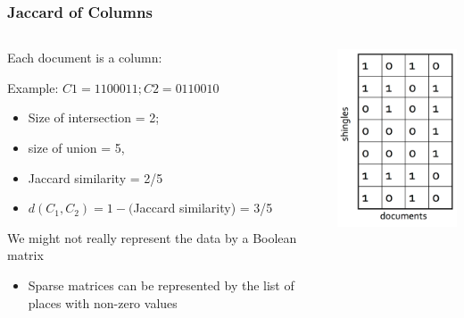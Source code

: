 \documentclass[svgnames]{beamer}
\begin{document}
\begin{frame} \frametitle{Jaccard of Columns}

 \begin{columns}[T]
  \begin{column}{0.5\textwidth}
  Each document is a column:

  {\scriptsize
  \begin{block}{Example: $C1 = 1100011; C2 = 0110010$}
  \scriptsize
  \begin{itemize}
  \scriptsize
  \item Size of intersection = 2; 
  \item size of union = 5, 
  \item Jaccard similarity = 2/5
  \item $d(C_1,C_2) = 1 - ($Jaccard similarity) = 3/5
  \end{itemize}
  \end{block}}  

  We might not really represent the data by a Boolean matrix
  \begin{itemize}
  \item Sparse matrices can be represented by the list of places with non-zero values
  \end{itemize}
  \end{column}
  \begin{column}{0.5\textwidth}
   \includegraphics[width=5cm]{matrix}
  \end{column}
 \end{columns}

\end{frame}

  
\end{document}
